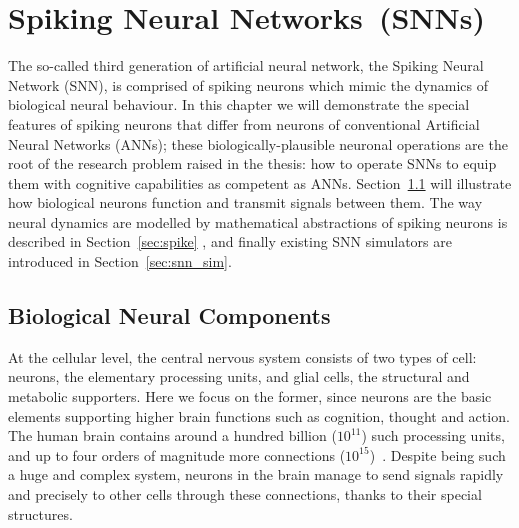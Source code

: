 \chapter{Spiking Neural Networks~(SNNs)}
\label{cha:bkg}
The so-called third generation of artificial neural network, the Spiking Neural Network (SNN), is comprised of spiking neurons which mimic the dynamics of biological neural behaviour.
In this chapter we will demonstrate the special features of spiking neurons that differ from neurons of conventional Artificial Neural Networks (ANNs);
these biologically-plausible neuronal operations are the root of the research problem raised in the thesis: how to operate SNNs to equip them with cognitive capabilities as competent as ANNs.
Section~\ref{sec:bio_neuron} will illustrate how biological neurons function and transmit signals between them.
The way neural dynamics are modelled by mathematical abstractions of spiking neurons is described in Section~\ref{sec:spike} , and finally existing SNN simulators are introduced in Section~\ref{sec:snn_sim}.

\section{Biological Neural Components}
\label{sec:bio_neuron}
At the cellular level, the central nervous system consists of two types of cell: neurons, the elementary processing units, and glial cells, the structural and metabolic supporters. 
Here we focus on the former, since neurons are the basic elements supporting higher brain functions such as cognition, thought and action. %
The human brain contains around a hundred billion ($10^{11}$) such processing units, and up to four orders of magnitude more connections ($10^{15}$)~\citep{azevedo2009equal}.
Despite being such a huge and complex system, neurons in the brain manage to send signals rapidly and precisely to other cells through these connections, thanks to their special structures.
